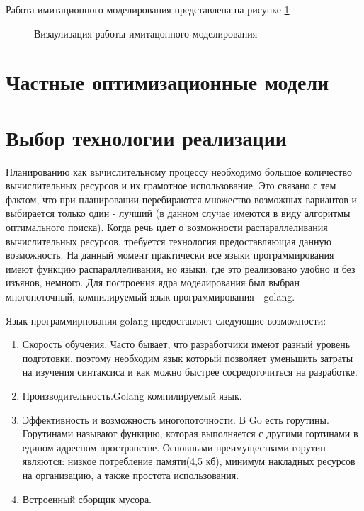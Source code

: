 Работа имитационного моделирования представлена на рисунке \ref{ris:alg}
\begin{figure}[H]
    \caption{Визаулизация работы имитацонного моделирования}
    \label{ris:alg}
\end{figure}

\section{Частные оптимизационные модели}

\section{Выбор технологии реализации}

Планированию как вычислительному процессу необходимо большое количество вычислительных ресурсов и их грамотное использование. Это связано с тем фактом, что при планировании перебираются множество возможных вариантов и выбирается только один - лучший (в данном случае имеются в виду алгоритмы оптимального поиска). Когда речь идет о возможности распараллеливания вычислительных ресурсов, требуется технология предоставляющая данную возможность. На данный момент практически все языки программирования имеют функцию распараллеливания, но языки, где это реализовано удобно и без изъянов, немного.  Для построения ядра моделирования был выбран многопоточный, компилируемый язык программирования - golang.

Язык программирпования golang предоставляет следующие возможности:

\begin{enumerate}
    \item Скорость обучения. Часто бывает, что разработчики имеют разный уровень подготовки, поэтому необходим язык который позволяет уменьшить затраты на изучения синтаксиса и как можно быстрее сосредоточиться на разработке. 
    \item Производительность.Golang компилируемый язык. 
    \item Эффективность и возможность многопоточности. В Go есть горутины. Горутинами называют функцию, которая выполняется с другими гортинами в едином адресном пространстве. Основными преимуществами горутин являются: низкое потребление памяти(4,5 кб), минимум накладных ресурсов на организацию, а также простота использования.
    \item Встроенный сборщик мусора.
\end{enumerate}

